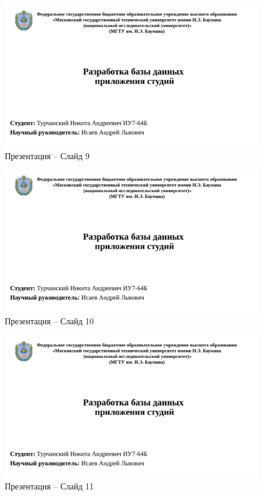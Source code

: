 \begin{appendices}
\begin{figure}[h]
	\begin{center}
		\includegraphics[page=9, width=\linewidth]{presentation.pdf}
	\end{center}
	\caption{Презентация -- Слайд 9}
\end{figure}

\begin{figure}[h]
	\begin{center}
		\includegraphics[page=10, width=\linewidth]{presentation.pdf}
	\end{center}
	\caption{Презентация -- Слайд 10}
\end{figure}

\begin{figure}[h]
	\begin{center}
		\includegraphics[page=11, width=\linewidth]{presentation.pdf}
	\end{center}
	\caption{Презентация -- Слайд 11}
\end{figure}


\end{appendices}
